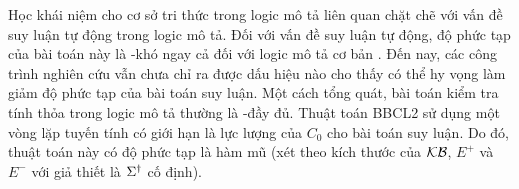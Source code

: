 \begin{Remark}
Học khái niệm cho cơ sở tri thức trong logic mô tả liên quan chặt chẽ với vấn đề suy luận tự động trong logic mô tả. Đối với vấn đề suy luận tự động, độ phức tạp của bài toán này là \EXPTIME-khó ngay cả đối với logic mô tả cơ bản \ALC. Đến nay, các công trình nghiên cứu vẫn chưa chỉ ra được dấu hiệu nào cho thấy có thể hy vọng làm giảm độ phức tạp của bài toán suy luận. Một cách tổng quát, bài toán 
kiểm tra tính thỏa trong logic mô tả thường là \EXPTIME-đầy đủ.
Thuật toán BBCL2 sử dụng một vòng lặp tuyến tính có giới hạn là lực lượng của $C_0$ cho bài toán suy luận. Do đó, thuật toán này có độ phức tạp là hàm mũ (xét theo kích thước của $\mathcal{KB}$, $E^+$ và $E^-$ với giả thiết là $\Sigma^\dag$ cố định).\myend
\end{Remark}

